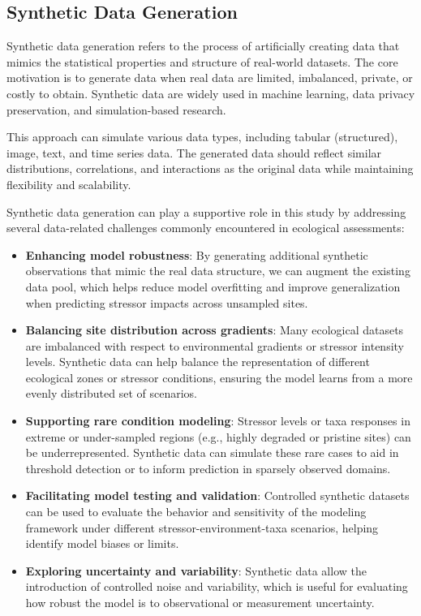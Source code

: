 \subsection{Synthetic Data Generation}

Synthetic data generation refers to the process of artificially creating data that mimics 
the statistical properties and structure of real-world datasets. 
The core motivation is to generate data when real data are limited, imbalanced,
 private, or costly to obtain. Synthetic data are widely used in machine learning,
  data privacy preservation, and simulation-based research.

This approach can simulate various data types, 
including tabular (structured), image, text, and time series data. 
The generated data should reflect similar distributions, correlations,
 and interactions as the original data while maintaining flexibility and scalability.

Synthetic data generation can play a supportive role in this study by addressing several data-related challenges 
commonly encountered in ecological assessments:

\begin{itemize}
    \item \textbf{Enhancing model robustness}: By generating additional synthetic observations that mimic the real data structure, we can augment the existing data pool, which helps reduce model overfitting and improve generalization when predicting stressor impacts across unsampled sites.
    
    \item \textbf{Balancing site distribution across gradients}: Many ecological datasets are imbalanced with respect to environmental gradients or stressor intensity levels. Synthetic data can help balance the representation of different ecological zones or stressor conditions, ensuring the model learns from a more evenly distributed set of scenarios.
    
    \item \textbf{Supporting rare condition modeling}: Stressor levels or taxa responses in extreme or under-sampled regions (e.g., highly degraded or pristine sites) can be underrepresented. Synthetic data can simulate these rare cases to aid in threshold detection or to inform prediction in sparsely observed domains.
    
    \item \textbf{Facilitating model testing and validation}: Controlled synthetic datasets can be used to evaluate the behavior and sensitivity of the modeling framework under different stressor-environment-taxa scenarios, helping identify model biases or limits.
    
    \item \textbf{Exploring uncertainty and variability}: Synthetic data allow the introduction of controlled noise and variability, which is useful for evaluating how robust the model is to observational or measurement uncertainty.
\end{itemize}

